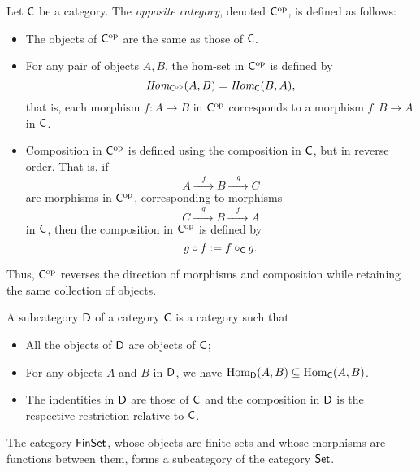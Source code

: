 \begin{definition} 
Let \(\mathsf{C}\) be a category. The \emph{opposite category}, denoted \(\mathsf{C}^{\mathrm{op}}\), is defined as follows:
\begin{itemize}
  \item The objects of \(\mathsf{C}^{\mathrm{op}}\) are the same as those of \(\mathsf{C}\).
  \item For any pair of objects \(A, B\), the hom-set in \(\mathsf{C}^{\mathrm{op}}\) is defined by
  \[
  \textit{Hom}_{\mathsf{C}^{\mathrm{op}}}(A, B) = \textit{Hom}_{\mathsf{C}}(B, A),
  \]
  that is, each morphism \(f: A \to B\) in \(\mathsf{C}^{\mathrm{op}}\) corresponds to a morphism \(f: B \to A\) in \(\mathsf{C}\).
  \item Composition in \(\mathsf{C}^{\mathrm{op}}\) is defined using the composition in \(\mathsf{C}\), but in reverse order. That is, if
  \[
  A \xrightarrow{ \quad f \quad } B \xrightarrow{\quad g \quad } C
  \]
  are morphisms in \(\mathsf{C}^{\mathrm{op}}\), corresponding to morphisms
  \[
  C \xrightarrow{ \quad g \quad} B \xrightarrow{ \quad f \quad} A
  \]
  in \(\mathsf{C}\), then the composition in \(\mathsf{C}^{\mathrm{op}}\) is defined by
  \[
  g \circ f := f \circ_{\mathsf{C}} g.
  \]
\end{itemize}

Thus, \(\mathsf{C}^{\mathrm{op}}\) reverses the direction of morphisms and composition while retaining the same collection of objects.
\end{definition}

\begin{definition}
  A subcategory \( \mathsf{D} \) of a category \( \mathsf{C} \) is a category such that 
  \begin{itemize}
    \item All the objects of \( \mathsf{D} \) are objects of \( \mathsf{C} \);
    \item  For any objects \( A \) and \( B \) in \( \mathsf{D} \), we have \( \mathrm{Hom}_{\mathsf{D}}(A, B) \subseteq \mathrm{Hom}_{\mathsf{C}}(A, B) \).
    \item The indentities in $\mathsf{D}$ are those of $\mathsf{C}$ and the composition in $\mathsf{D}$ is the respective restriction relative to $\mathsf{C}$.
  \end{itemize}
  
\end{definition}

\begin{example}
  The category $\mathsf{FinSet}$, whose objects are finite sets and whose morphisms are functions between them, forms a subcategory of the category $\mathsf{Set}$.
\end{example}


